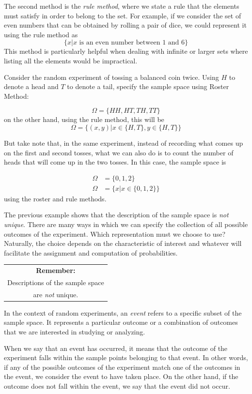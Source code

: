 \documentclass{article}
\begin{document}
The second method is the \emph{rule method}, where we state a rule that the elements must satisfy in order to belong to the set. For example, if we consider the set of even numbers that can be obtained by rolling a pair of dice, we could represent it using the rule method as
$$
\{x | x \text{ is an even number between } 1 \text{ and } 6\}
$$
This method is particularly helpful when dealing with infinite or larger sets where listing all the elements would be impractical.

Consider the random experiment of tossing a balanced coin twice. Using $H$ to denote a head and $T$ to denote a tail, specify the sample space using Roster Method:

$$
\Omega = \{HH, HT, TH, TT\}
$$
on the other hand, using the rule method, this will be
$$
\Omega = \{(x,y) | x \in \{H,T\}, y \in \{H,T\} \}
$$

But take note that, in the same experiment, instead of recording what comes up on the first and second tosses, what we can also do is to count the number of heads that will come up in the two tosses. In this case, the sample space is

$$
\begin{aligned}
\Omega &= \{0, 1, 2 \} \\
\Omega &= \{x | x \in \{0,1,2 \} \}
\end{aligned}
$$
using the roster and rule methods.

The previous example shows that the description of the sample space is \emph{not unique}. There are many ways in which we can specify the collection of all possible outcomes of the experiment. Which representation must we choose to use? Naturally, the choice depends on the characteristic of interest and whatever will facilitate the assignment and computation of probabilities.

\begin{margintable}
\begin{tabular}{c} 
    \textbf{Remember:} \\
    Descriptions of the sample space \\ are \emph{not} unique.
\end{tabular}
\end{margintable}

In the context of random experiments, an \emph{event} refers to a specific subset of the sample space. It represents a particular outcome or a combination of outcomes that we are interested in studying or analyzing.

When we say that an event has occurred, it means that the outcome of the experiment falls within the sample points belonging to that event. In other words, if any of the possible outcomes of the experiment match one of the outcomes in the event, we consider the event to have taken place. On the other hand, if the outcome does not fall within the event, we say that the event did not occur.
\end{document}

